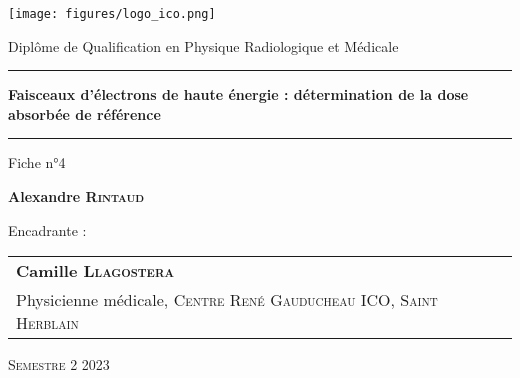 \begin{titlepage}

    \unitlength 1cm
    \begin{center}
    
    \vspace*{1cm}

    \texttt{[image: figures/logo\_ico.png]}
    
    \vspace{2cm}
    
               {\Large Diplôme de Qualification en Physique Radiologique et Médicale\\}
               
    \vspace{2cm}           
    
    
    \rule{16cm}{0.7pt}
    
    \vspace{12pt}
               
               {\LARGE \bf Faisceaux d'électrons de haute énergie : détermination de la dose absorbée de référence\\}
               
    \vspace{12pt}
    \rule{16cm}{0.7pt}

    \vspace{2cm}

                {\large Fiche n°4}
    
    \vspace{1.5cm}

               {\Large\bf {Alexandre \textsc{Rintaud}}}
    
    \vspace{1.5cm}
    
    \end{center}
    
    Encadrante :
    
    \small {
    \begin{tabular}{llr}\\
    \textbf{Camille \textsc{Llagostera}}   &  &  \\
      Physicienne médicale, \textsc{Centre René Gauducheau ICO, Saint Herblain} &    &  \\
    
    \end{tabular}
    }

    \vspace{1.5cm}


    \begin{center}
    \textsc{Semestre 2 2023}
    \end{center}
    
\end{titlepage}
\let\cleardoublepage\clearpage
